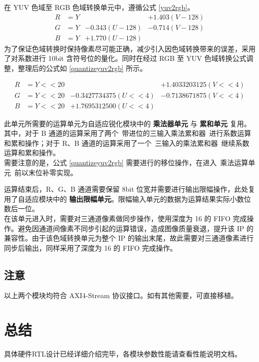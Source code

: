 \documentclass[12pt, a4paper, oneside]{ctexbook}
\begin{document}
	在 YUV 色域至 RGB 色域转换单元中，遵循公式 \ref{yuv2rgb}。
	\begin{equation} \label{yuv2rgb}
		\begin{aligned}
			R &= Y & &+ 1.403(V - 128) \\
			G &= Y &- 0.343(U - 128) &-0.714(V- 128) \\
			B &= Y &+ 1.770(U - 128) & 
		\end{aligned}
	\end{equation}
	为了保证色域转换时保持像素尽可能正确，减少引入因色域转换带来的误差，采用了对系数进行 10bit 含符号位的量化。同时在经过 RGB 至 YUV 色域转换公式调整，整理后的公式如 \ref{quantizeyuv2rgb} 所示。
	
	\begin{equation} \label{quantizeyuv2rgb}
		\begin{aligned}
			R &= Y << 20 & &+ 1.4033203125(V << 4) \\
			G &= Y << 20 &- 0.3427734375(U << 4) &-0.7138671875(V << 4) \\
			B &= Y << 20 &+ 1.7695312500(U << 4) &
		\end{aligned}
	\end{equation}

	此单元所需要的运算单元为自适应锐化模块中的 \textbf{乘法器单元} 与 \textbf{累和单元} 复用。其中，对于 B 通道的运算采用了两个\ 带进位的三输入乘法累和器\ 进行系数运算和累和操作；对于 R、B 通道的运算采用了一个\ 三输入的乘法累和器\ 继续系数运算和累和操作。\\
	
	需要注意的是，公式 \ref{quantizeyuv2rgb} 需要进行的移位操作，在进入\ 乘法运算单元\ 前以末位补零实现。
	
	运算结束后，R、G、B 通道需要保留 8bit 位宽并需要进行输出限幅操作，此处复用了自适应模块中的 \textbf{输出限幅单元}。限幅输入单元的数据为运算结果实际小数位数后一位。\\
	
	在该单元进入时，需要对三通道像素做同步操作，使用深度为 16 的 FIFO 完成操作。避免因通道间像素不同步引起的运算错误，造成图像质量衰退，提升该 IP 的兼容性。由于该色域转换单元为整个 IP 的输出末尾，故此需要对三通道像素进行同步后输出，同样采用了深度为 16 的 FIFO 完成操作。
	
	\section{注意}
	以上两个模块均符合 AXI4-Stream 协议接口。如有其他需要，可直接移植。

	
	\chapter{总结}
	具体硬件RTL设计已经详细介绍完毕，各模块参数性能请查看性能说明文档。
	
\end{document}
